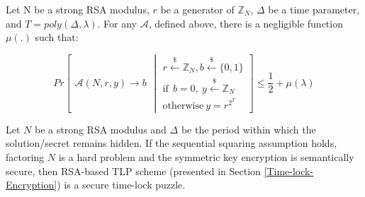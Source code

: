 



\begin{assumption}\label{assumption::SequentialSquaring} Let N be a  strong RSA modulus, $r$ be a generator of $\mathbb{Z}_{\scriptscriptstyle N}$,   $\Delta$ be a time parameter, and $T=poly(\Delta,\lambda)$. For  any $\mathcal{A}$, defined above,  there is a negligible function $\mu(.)$ such that: 

$$ Pr\left[
  \begin{array}{l}
\mathcal{A}(N, r,y) \rightarrow b
\end{array} 
\middle |
    \begin{array}{l}
r \stackrel{\scriptscriptstyle \$}\leftarrow \mathbb{Z}_{\scriptscriptstyle N}, b\stackrel{\scriptscriptstyle \$}\leftarrow \{0,1\}\\
\text{if} \ \ b=0,\   y \stackrel{\scriptscriptstyle \$}\leftarrow \mathbb{Z}_{\scriptscriptstyle N} \\
\text {otherwise}\ y=r^{\scriptscriptstyle 2^{\scriptscriptstyle T}}
\end{array}    \right]\leq \frac{1}{2}+\mu(\lambda)$$

\end{assumption}






\begin{theorem}\label{theorem::R-LTP-Sec}
Let $N$ be a  strong RSA modulus and $\Delta$ be the period within which the solution/secret remains hidden. If the sequential squaring assumption holds,  factoring $N$ is a hard problem and the symmetric key encryption is  semantically secure, then RSA-based TLP scheme (presented in Section \ref{Time-lock-Encryption})  is a secure time-lock puzzle.
\end{theorem}



